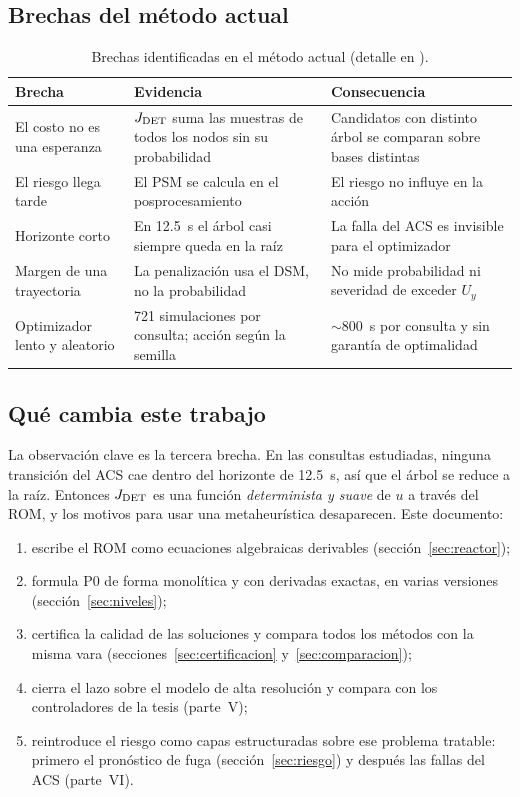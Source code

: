 \subsection{Brechas del método actual}
\begin{table}[H]\centering\small
\begin{tabularx}{\linewidth}{@{}l Y Y@{}}\toprule
Brecha & Evidencia & Consecuencia\\\midrule
El costo no es una esperanza & $J_{\rm DET}$ suma las muestras de todos los nodos sin su probabilidad & Candidatos con distinto árbol se comparan sobre bases distintas\\
El riesgo llega tarde & El PSM se calcula en el posprocesamiento & El riesgo no influye en la acción\\
Horizonte corto & En 12.5~s el árbol casi siempre queda en la raíz & La falla del ACS es invisible para el optimizador\\
Margen de una trayectoria & La penalización usa el DSM, no la probabilidad & No mide probabilidad ni severidad de exceder $U_y$\\
Optimizador lento y aleatorio & 721 simulaciones por consulta; acción según la semilla & $\sim800$~s por consulta y sin garantía de optimalidad\\\bottomrule
\end{tabularx}
\caption{Brechas identificadas en el método actual (detalle en
).}
\end{table}

\subsection{Qué cambia este trabajo}
La observación clave es la tercera brecha. En las consultas estudiadas, ninguna transición del
ACS cae dentro del horizonte de 12.5~s, así que el árbol se reduce a la raíz. Entonces
$J_{\rm DET}$ es una función \emph{determinista y suave} de $u$ a través del ROM, y los motivos
para usar una metaheurística desaparecen. Este documento:
\begin{enumerate}
  \item escribe el ROM como ecuaciones algebraicas derivables (sección~\ref{sec:reactor});
  \item formula P0 de forma monolítica y con derivadas exactas, en varias versiones
        (sección~\ref{sec:niveles});
  \item certifica la calidad de las soluciones y compara todos los métodos con la misma vara
        (secciones~\ref{sec:certificacion} y~\ref{sec:comparacion});
  \item cierra el lazo sobre el modelo de alta resolución y compara con los controladores de
        la tesis (parte~V);
  \item reintroduce el riesgo como capas estructuradas sobre ese problema tratable: primero el
        pronóstico de fuga (sección~\ref{sec:riesgo}) y después las fallas del ACS
        (parte~VI).
\end{enumerate}

